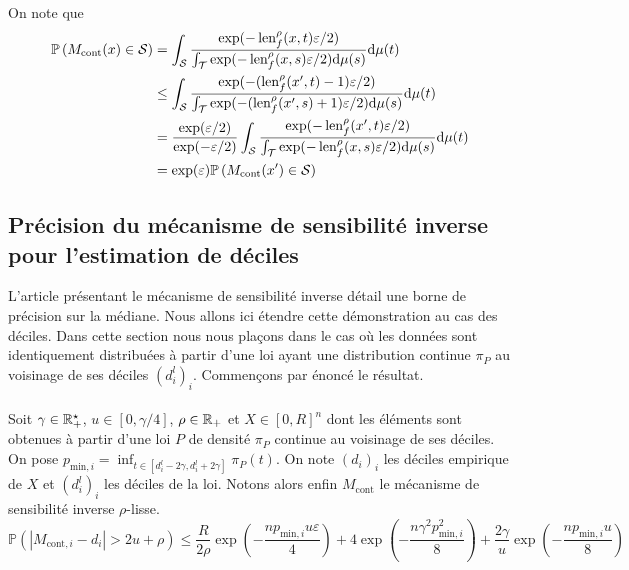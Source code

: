 On note que 
\begin{align*}
    \mathbb P\left( M_{\text{cont}}(x) \in \mathcal S \right) & = \int_\mathcal S \dfrac{\exp(-\operatorname{len}_f^\rho(x, t)\varepsilon/2)}{\int_\mathcal T \exp(-\operatorname{len}_f^\rho(x, s)\varepsilon/2)\mathrm{d} \mu(s)}    \mathrm{d} \mu(t)\\
    & \leq \int_\mathcal S \dfrac{\exp(-(\operatorname{len}_f^\rho(x', t)-1)\varepsilon/2)}{\int_\mathcal T \exp(-(\operatorname{len}_f^\rho(x', s)+1)\varepsilon/2)\mathrm{d} \mu(s)}    \mathrm{d} \mu(t)\\
    & = \dfrac{\exp(\varepsilon/2)}{\exp(-\varepsilon/2)}\int_\mathcal S \dfrac{\exp(-\operatorname{len}_f^\rho(x', t)\varepsilon/2)}{\int_\mathcal T \exp(-\operatorname{len}_f^\rho(x, s)\varepsilon/2)\mathrm{d} \mu(s)}    \mathrm{d} \mu(t)\\
    & = \exp(\varepsilon) \mathbb P\left( M_{\text{cont}}(x') \in \mathcal S \right)
\end{align*}


\subsection{Précision du mécanisme de sensibilité inverse pour l'estimation de déciles}



L'article présentant le mécanisme de sensibilité inverse \cite{Asi2020NearII} détail une borne de précision sur la médiane. Nous allons ici étendre cette démonstration au cas des déciles. Dans cette section nous nous plaçons dans le cas où les données sont identiquement distribuées à partir d'une loi ayant une distribution continue \(\pi_P\) au voisinage de ses déciles \((d_i^l)_i\). Commençons par énoncé le résultat.\\

\theoreme{}\\
Soit \(\gamma \in \mathbb{R}_+^\star\), \(u \in [0, \gamma/4]\), \(\rho \in \mathbb{R}_+\) et \(X \in [0,R]^n\) dont les éléments sont obtenues à partir d'une loi \(P\) de densité \(\pi_P\) continue au voisinage de ses déciles. On pose \(p_{\text{min}, i} = \inf_{t \in [d_i^l - 2\gamma, d_i^l + 2\gamma]} \pi_P(t)\). On note \((d_i)_i\) les déciles empirique de \(X\) et \((d_i^l)_i\) les déciles de la loi. Notons alors enfin \(M_{\text{cont}}\) le mécanisme de sensibilité inverse \(\rho\)-lisse.
\[
    \mathbb P\left( |M_{\text{cont}, i} - d_i| > 2u + \rho\right) \leq \dfrac{R}{2\rho}\exp\left(- \dfrac{np_{\text{min}, i}u\varepsilon}{4} \right) + 4\exp\left(- \dfrac{n\gamma^2p_{\text{min},i}^2}{8} \right) + \dfrac{2\gamma}{u}\exp\left( -\dfrac{np_{\text{min},i}u}{8} \right)
\]


